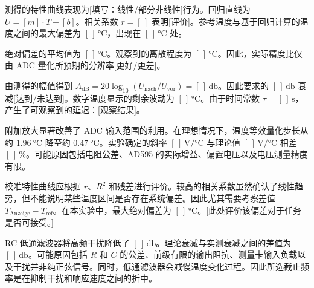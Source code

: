 测得的特性曲线表现为[填写：线性/部分非线性]行为。回归直线为 $U = [m] \cdot T + [b]$。相关系数 $r = [\,]$ 表明[评价]。参考温度与基于回归计算的温度之间的最大偏差为 $[\,]\,\si{\celsius}$，出现在 $[\,]\,\si{\celsius}$ 处。

绝对偏差的平均值为 $[\,]\,\si{\celsius}$。观察到的离散程度为 $[\,]\,\si{\celsius}$。因此，实际精度比仅由 ADC 量化所预期的分辨率[更好/更差]。

由测得的幅值得到 $A_{\mathrm{dB}} = 20 \log_{10}(U_{\mathrm{nach}}/U_{\mathrm{vor}}) = [\,]\,\si{\decibel}$。因此要求的 $[\,]\,\si{\decibel}$ 衰减[达到/未达到]。数字温度显示的剩余波动为 $[\,]\,\si{\celsius}$。由于时间常数 $\tau = [\,]\,\si{\second}$，产生了可观察到的延迟：[观察结果]。

附加放大显著改善了 ADC 输入范围的利用。在理想情况下，温度等效量化步长从约 $\SI{1.96}{\celsius}$ 降至约 $\SI{0.47}{\celsius}$。实验确定的斜率 $[\,]\,\si{\volt\per\celsius}$ 与理论值 $[\,]\,\si{\volt\per\celsius}$ 相差 $[\,]\,\%$。可能原因包括电阻公差、AD595 的实际增益、偏置电压以及电压测量精度有限。

校准特性曲线应根据 $r$、$R^2$ 和残差进行评价。较高的相关系数虽然确认了线性趋势，但不能说明某些温度区间是否存在系统偏差。因此尤其需要考察差值 $T_{\mathrm{Anzeige}} - T_{\mathrm{ref}}$。在本实验中，最大绝对偏差为 $[\,]\,\si{\celsius}$。[此处评价该偏差对于任务是否可接受。]

RC 低通滤波器将高频干扰降低了 $[\,]\,\si{\decibel}$。理论衰减与实测衰减之间的差值为 $[\,]\,\si{\decibel}$。可能原因包括 $R$ 和 $C$ 的公差、前级有限的输出阻抗、测量卡输入负载以及干扰并非纯正弦信号。同时，低通滤波器会减慢温度变化过程。因此所选截止频率是在抑制干扰和响应速度之间的折中。

